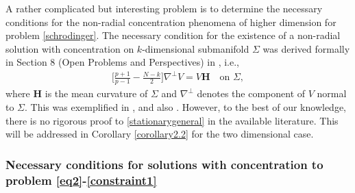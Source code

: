 \documentclass[10pt, reqno]{amsart}
\numberwithin{equation}{section}
\theoremstyle{definition}
\begin{document}


\bigskip
A rather complicated but interesting problem is to determine the necessary conditions for the non-radial concentration phenomena of higher dimension for problem \eqref{schrodinger}.
The necessary condition for the existence of a non-radial solution with concentration on $k$-dimensional submanifold $\Sigma$ was derived formally in Section 8 (Open Problems and Perspectives) in \cite{AMNconjecture1}, i.e.,
\begin{align}
\bigg[\frac{p+1}{p-1}-\frac{N-k}{2}\bigg] \nabla^\perp V=V \mathbf{H}\quad \mbox{on } \Sigma,
\label{stationarygeneral}
\end{align}
where $\mathbf{H}$ is the mean curvature of $\Sigma$
and $\nabla^\perp$ denotes the component of $V$ normal to $\Sigma$.
This was exemplified in \cite{delPKowWei1}, \cite{SWei-Yang} and also \cite{WangWeiYang}.
However, to the best of our knowledge, there is no rigorous proof to \eqref{stationarygeneral} in the available literature.
This will be addressed in Corollary \ref{corollary2.2} for the two dimensional case.



\subsubsection{Necessary conditions for solutions with concentration to problem \eqref{eq2}-\eqref{constraint1}}\
\end{document}
